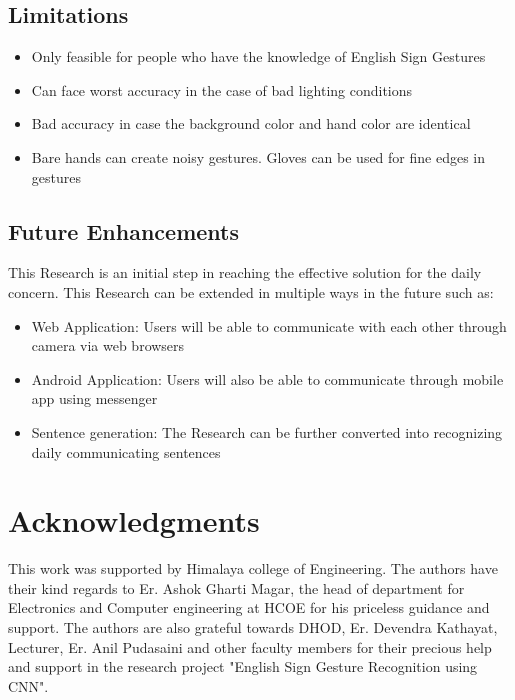 \documentclass[fleqn, 11pt, twoside]{IOEGC}
\begin{document}
    \subsection{Limitations}
        \begin{itemize}
            \item Only feasible for people who have the knowledge of English Sign Gestures
            \item Can face worst accuracy in the case of bad lighting conditions
            \item Bad accuracy in case the background color and hand color are identical
            \item Bare hands can create noisy gestures. Gloves can be used for fine edges in gestures
        \end{itemize}
    \subsection{Future Enhancements}
        This Research is an initial step in reaching the effective solution for the daily concern. This Research can be extended in multiple ways in the future such as:
        \begin{itemize}
            \item Web Application: Users will be able to communicate with each other through camera via web browsers
            \item Android Application: Users will also be able to communicate through mobile app using messenger
            \item Sentence generation: The Research can be further converted into recognizing daily communicating sentences
        \end{itemize}
    

\section*{Acknowledgments} 
This work was supported by Himalaya college of Engineering. The authors have their kind regards to Er. Ashok Gharti Magar, the head of department for Electronics and Computer engineering at HCOE for his priceless guidance and support. The authors are also grateful towards DHOD, Er. Devendra Kathayat, Lecturer, Er. Anil Pudasaini and other faculty members for their precious help and support in the research project "English Sign Gesture Recognition using CNN".






\vfill\null
\end{document}
